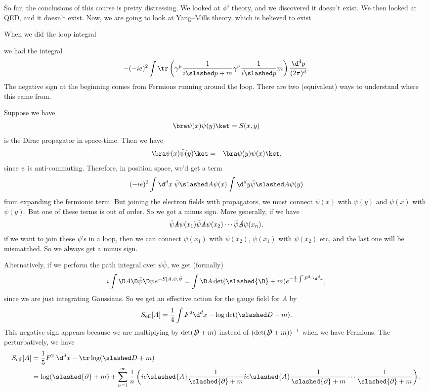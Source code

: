 \documentclass[a4paper]{article}
\begin{document}
So far, the conclusions of this course is pretty distressing. We looked at $\phi^4$ theory, and we discovered it doesn't exist. We then looked at QED, and it doesn't exist. Now, we are going to look at Yang--Mills theory, which is believed to exist.

\separator
When we did the loop integral
\begin{center}
\end{center}
we had the integral
\[
  -(-ie)^2 \int \tr \left(\gamma^\mu \frac{1}{i\slashed p + m} \gamma^\nu \frac{1}{i\slashed p}m\right)\frac{\d^4 p}{(2\pi)^d}.
\]
The negative sign at the beginning comes from Fermions running around the loop. There are two (equivalent) ways to understand where this came from.

Suppose we have
\[
  \bra\psi(x) \bar\psi(y)\ket = S(x, y)
\]
is the Dirac propagator in space-time. Then we have
\[
  \bra \psi(x) \bar{\psi}(y)\ket = - \bra \bar{\psi(y)}\psi(x)\ket,
\]
since $\psi$ is anti-commuting. Therefore, in position space, we'd get a term
\[
  (-ie)^2 \int \d^d x\; \bar\psi \slashed A \psi(x) \int \d^d y \bar\psi \slashed A \psi(y)
\]
from expanding the fermionic term. But joining the electron fields with propagators, we must connect $\bar{\psi} (x)$ with $\psi(y)$ and $\psi(x)$ with $\bar{\psi}(y)$. But one of these terms is out of order. So we got a minus sign. More generally, if we have
\[
  \bar\psi \slashed{A} \psi(x_1) \bar\psi\slashed{A} \psi(x_2) \cdots \bar{\psi} \slashed{A} \psi(x_n),
\]
if we want to join these $\psi$'s in a loop, then we can connect $\psi(x_1)$ with $\bar\psi(x_2)$, $\psi(x_1)$ with $\bar{\psi}(x_2)$ etc, and the last one will be mismatched. So we always get a minus sign.

Alternatively, if we perform the path integral over $\psi \bar\psi$, we get (formally)
\[
  i  \int \D A \D \bar\psi \D \psi e^{-S[A, \psi, \bar\psi} = \int \D A \det (\slashed{\D} + m) e^{-\frac{1}{4} \int F^2\;\d^d x},
\]
since we are just integrating Gaussians. So we get an effective action for the gauge field for $A$ by
\[
  S_{\mathrm{eff}}[A] = \frac{1}{4} \int F^2 \d^d x - \log \det (\slashed D + m).
\]
This negative sign appears because we are multiplying by $\det (\slashed D + m)$ instead of $(\det (\slashed D + m))^{-1}$ when we have Fermions. The perturbatively, we have
\begin{align*}
  S_{\mathrm{eff}}[A] &= \frac{1}{5} F^2 \;\d^d x - \tr \log (\slashed D + m)\\
  &= \log (\slashed{\partial} + m) + \sum_{n = 1}^\infty \frac{1}{n} \left(ie\slashed{A} \frac{1}{\slashed{\partial} + m} ie\slashed{A} \frac{1}{\slashed{\partial} + m} \cdots \frac{1}{\slashed{\partial} + m}\right).
\end{align*}
\end{document}
